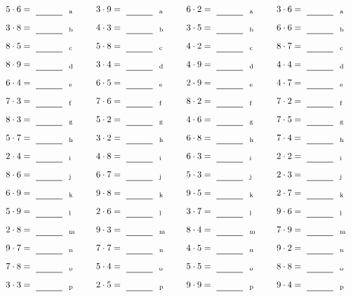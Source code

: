 \documentclass
[
  draft    = true,
  fontsize = 11pt,
  parskip  = half-
]
{scrartcl}
\begin{document}
\par\vfill\par
\begin{align*}
    \pline{5\cdot6}&=\rline{a}
  & \pline{3\cdot9}&=\rline{a}
  & \pline{6\cdot2}&=\rline{a}
  & \pline{3\cdot6}&=\rline{a} \\[1ex]
    \pline{3\cdot8}&=\rline{b}
  & \pline{4\cdot3}&=\rline{b}
  & \pline{3\cdot5}&=\rline{b}
  & \pline{6\cdot6}&=\rline{b} \\[1ex]
    \pline{8\cdot5}&=\rline{c}
  & \pline{5\cdot8}&=\rline{c}
  & \pline{4\cdot2}&=\rline{c}
  & \pline{8\cdot7}&=\rline{c} \\[1ex]
    \pline{8\cdot9}&=\rline{d}
  & \pline{3\cdot4}&=\rline{d}
  & \pline{4\cdot9}&=\rline{d}
  & \pline{4\cdot4}&=\rline{d} \\[1ex]
    \pline{6\cdot4}&=\rline{e}
  & \pline{6\cdot5}&=\rline{e}
  & \pline{2\cdot9}&=\rline{e}
  & \pline{4\cdot7}&=\rline{e} \\[1ex]
    \pline{7\cdot3}&=\rline{f}
  & \pline{7\cdot6}&=\rline{f}
  & \pline{8\cdot2}&=\rline{f}
  & \pline{7\cdot2}&=\rline{f} \\[1ex]
    \pline{8\cdot3}&=\rline{g}
  & \pline{5\cdot2}&=\rline{g}
  & \pline{4\cdot6}&=\rline{g}
  & \pline{7\cdot5}&=\rline{g} \\[1ex]
    \pline{5\cdot7}&=\rline{h}
  & \pline{3\cdot2}&=\rline{h}
  & \pline{6\cdot8}&=\rline{h}
  & \pline{7\cdot4}&=\rline{h} \\[1ex]
    \pline{2\cdot4}&=\rline{i}
  & \pline{4\cdot8}&=\rline{i}
  & \pline{6\cdot3}&=\rline{i}
  & \pline{2\cdot2}&=\rline{i} \\[1ex]
    \pline{8\cdot6}&=\rline{j}
  & \pline{6\cdot7}&=\rline{j}
  & \pline{5\cdot3}&=\rline{j}
  & \pline{2\cdot3}&=\rline{j} \\[1ex]
    \pline{6\cdot9}&=\rline{k}
  & \pline{9\cdot8}&=\rline{k}
  & \pline{9\cdot5}&=\rline{k}
  & \pline{2\cdot7}&=\rline{k} \\[1ex]
    \pline{5\cdot9}&=\rline{l}
  & \pline{2\cdot6}&=\rline{l}
  & \pline{3\cdot7}&=\rline{l}
  & \pline{9\cdot6}&=\rline{l} \\[1ex]
    \pline{2\cdot8}&=\rline{m}
  & \pline{9\cdot3}&=\rline{m}
  & \pline{8\cdot4}&=\rline{m}
  & \pline{7\cdot9}&=\rline{m} \\[1ex]
    \pline{9\cdot7}&=\rline{n}
  & \pline{7\cdot7}&=\rline{n}
  & \pline{4\cdot5}&=\rline{n}
  & \pline{9\cdot2}&=\rline{n} \\[1ex]
    \pline{7\cdot8}&=\rline{o}
  & \pline{5\cdot4}&=\rline{o}
  & \pline{5\cdot5}&=\rline{o}
  & \pline{8\cdot8}&=\rline{o} \\[1ex]
    \pline{3\cdot3}&=\rline{p}
  & \pline{2\cdot5}&=\rline{p}
  & \pline{9\cdot9}&=\rline{p}
  & \pline{9\cdot4}&=\rline{p}
\end{align*}
\end{document}

